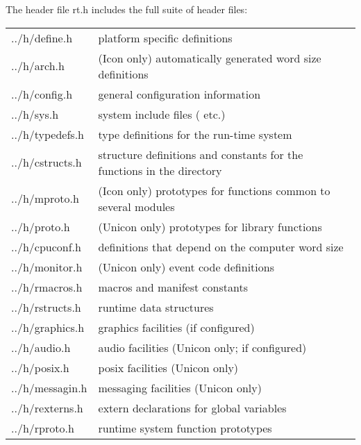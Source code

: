 {\renewcommand{\arraystretch}{0.9}%
\noindent
The header file rt.h includes the full suite of header files:\\[1ex]

\noindent\hspace{0.5cm}%
\begin{xtabular}{>{\textfn\bgroup}l<{\egroup}@{\hspace{1cm}}p{11cm}}
../h/define.h    & platform specific definitions\\
../h/arch.h      & (Icon only) automatically generated word size definitions\\
../h/config.h    & general configuration information\\ 
../h/sys.h	 & system include files ( etc.)\\ 
../h/typedefs.h  & type definitions for the run-time system\\
../h/cstructs.h  & structure definitions and constants for the
                   functions in the  directory\\
%
../h/mproto.h	 & (Icon only) prototypes for functions common to several modules\\
%
{\color{blue}../h/proto.h} &%
    {\hspace{0cm}\color{blue}(Unicon only) prototypes for library functions}\\
%
../h/cpuconf.h   & definitions that depend on the computer word size\\
{\color{blue}../h/monitor.h} &%
    {\hspace{0cm}\color{blue}  (Unicon only) event code definitions}\\
../h/rmacros.h   & macros and manifest constants\\ 
../h/rstructs.h  & runtime data structures\\
../h/graphics.h  & graphics facilities (if configured) \\
../h/audio.h     & audio facilities (Unicon only; if configured) \\
../h/posix.h     & posix facilities (Unicon only) \\
../h/messagin.h  & messaging facilities (Unicon only) \\
../h/rexterns.h  & extern declarations for global variables \\
../h/rproto.h    & runtime system function prototypes
\end{xtabular}
}\\[1ex]


